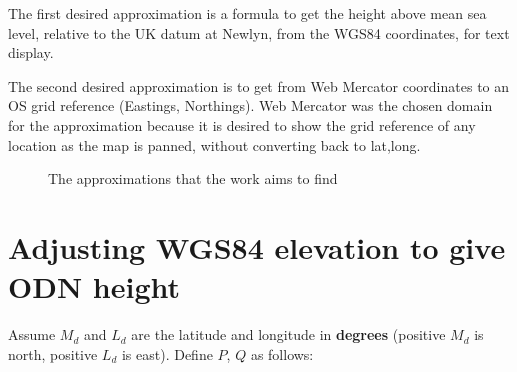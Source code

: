 \documentclass[10pt,a4paper]{article}
\def\tkname#1{}
\begin{document}
The first desired approximation is a formula to get the height above mean sea
level, relative to the UK datum at Newlyn, from the WGS84 coordinates, for text
display.

The second desired approximation is to get from Web Mercator coordinates to an
OS grid reference (Eastings, Northings).  Web Mercator was the chosen domain
for the approximation because it is desired to show the grid reference of any
location as the map is panned, without converting back to lat,long.

\begin{figure}[htbp]
  \hrulefill

  \centering
  \tkname{aims}
\caption{The approximations that the work aims to find}
\label{fig:aims}

  \hrulefill
\end{figure}

\section {Adjusting WGS84 elevation to give ODN height}
Assume $M_d$ and $L_d$ are the latitude and longitude in \textbf{degrees}
(positive $M_d$ is north, positive $L_d$ is east).  Define $P$, $Q$ as follows:
\end{document}
